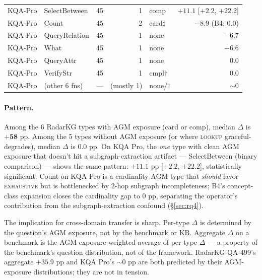 \documentclass[11pt,a4paper]{article}
\newcommand{\op}[1]{\textsc{\small #1}}
\begin{document}
\begin{table}[t]
\begin{tabular}{l l r r l r}
\midrule
KQA-Pro     & SelectBetween       & 45 &   1  & comp       & $\mathbf{+11.1}$ [$+2.2$, $+22.2$] \\
KQA-Pro     & Count               & 45 &   2  & card$\ddagger$ & $-8.9$ (B4: $0.0$) \\
KQA-Pro     & QueryRelation       & 45 &   1  & none       & $-6.7$ \\
KQA-Pro     & What                & 45 &   1  & none       & $+6.6$ \\
KQA-Pro     & QueryAttr           & 45 &   1  & none       & $0.0$ \\
KQA-Pro     & VerifyStr           & 45 &   1  & cmpl$\dagger$ & $0.0$ \\
KQA-Pro     & (other 6 fns)       & --- & (mostly 1) & none/$\dagger$ & ${\sim}0$ \\
\bottomrule
\end{tabular}
\end{table}

\paragraph{Pattern.}
Among the 6 RadarKG types with AGM exposure (\textsf{card} or \textsf{comp}), median $\Delta$ is $\mathbf{+58}$ pp. Among the 5 types without AGM exposure (or where \op{lookup} graceful-degrades), median $\Delta$ is $\mathbf{0.0}$ pp. On KQA Pro, the \emph{one} type with clean AGM exposure that doesn't hit a subgraph-extraction artifact --- SelectBetween (binary comparison) --- shows the same pattern: $+11.1$ pp [$+2.2$, $+22.2$], statistically significant. Count on KQA Pro is a cardinality-AGM type that \emph{should} favor \op{exhaustive} but is bottlenecked by 2-hop subgraph incompleteness; B4's concept-class expansion closes the cardinality gap to 0 pp, separating the operator's contribution from the subgraph-extraction confound (§\ref{sec:rq4}).

The implication for cross-domain transfer is sharp. Per-type $\Delta$ is determined by the question's AGM exposure, not by the benchmark or KB. Aggregate $\Delta$ on a benchmark is the AGM-exposure-weighted average of per-type $\Delta$ --- a property of the benchmark's question distribution, not of the framework. RadarKG-QA-499's aggregate $+35.9$ pp and KQA Pro's ${\sim}0$ pp are both predicted by their AGM-exposure distributions; they are not in tension.
\end{document}
